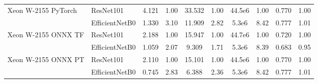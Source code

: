 {\begin{tabular}{l|l|c|c|c|c|c|c|c|c}
        \midrule
        \multirow{2}{*}{Xeon W-2155 PyTorch} &ResNet101 & 4.121 & \colorbox{RC}{1.00} & 33.532 & \colorbox{RC}{1.00} & 44.5e6 & \colorbox{RD}{1.00} & 0.770 & \colorbox{RC}{1.00} \\
        & EfficientNetB0 & 1.330 & \colorbox{RA}{3.10} & 11.909 & \colorbox{RA}{2.82} &  5.3e6 & \colorbox{RA}{8.42} & 0.777 & \colorbox{RB}{1.01} \\
        \midrule
        \multirow{2}{*}{Xeon W-2155 ONNX TF} &ResNet101 & 2.188 & \colorbox{RC}{1.00} & 15.947 & \colorbox{RC}{1.00} & 44.7e6 & \colorbox{RD}{1.00} & 0.720 & \colorbox{RC}{1.00} \\
        & EfficientNetB0 & 1.059 & \colorbox{RA}{2.07} & 9.309 & \colorbox{RB}{1.71} &  5.3e6 & \colorbox{RB}{8.39} & 0.683 & \colorbox{RD}{0.95} \\
        \midrule
        \multirow{2}{*}{Xeon W-2155 ONNX PT} &ResNet101 & 2.110 & \colorbox{RC}{1.00} & 15.101 & \colorbox{RC}{1.00} & 44.5e6 & \colorbox{RD}{1.00} & 0.770 & \colorbox{RC}{1.00} \\
        & EfficientNetB0 & 0.745 & \colorbox{RA}{2.83} & 6.388 & \colorbox{RA}{2.36} &  5.3e6 & \colorbox{RA}{8.42} & 0.777 & \colorbox{RB}{1.01} \\
        
        \bottomrule
    \end{tabular}
    }